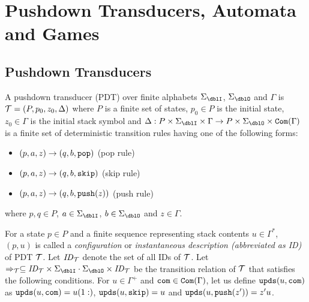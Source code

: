 \section{Pushdown Transducers, Automata and Games}
\subsection{Pushdown Transducers}
\begin{definition}
A {pushdown transducer} (PDT)
over finite alphabets $\Sigma_\dblI$, $\Sigma_\dblO$ and $\Gamma$
is ${\cal T}=(P, p_0, z_0, \Delta)$ where
$P$ is a finite set of states,
$p_0\in P$ is the initial state,
$z_0\in \Gamma$ is the initial stack symbol and
$\Delta: P\times \Sigma_\dblI \times \Gamma \to P\times \Sigma_\dblO \times \Com(\Gamma)$ is a finite set of deterministic transition rules having one of the following forms:
\begin{itemize}
\item $(p, a, z) \rightarrow (q, b, \mathtt{pop})$ \quad (pop rule)
\item $(p, a, z) \rightarrow (q, b, \mathtt{skip})$ \quad (skip rule)
\item $(p, a, z) \rightarrow (q, b, \mathtt{push}(z))$ \quad (push rule)
\end{itemize}
where $p, q\in P$, $a\in\Sigma_\dblI$, $b\in\Sigma_\dblO$ and $z\in\Gamma$.
\end{definition}
\noindent
For a state $p\in P$ and
a finite sequence representing stack contents $u \in \Gamma^*$,
$(p, u)$ is called
a {\em configuration} or {\em instantaneous description (abbreviated as ID)} of PDT ${\cal T}$. Let $\mathit{ID}_{\cal T}$ denote the set of all IDs of ${\cal T}$.
Let $\Rightarrow_\calT\subseteq \ID_\calT\times \Sigma_\dblI\cdot\Sigma_\dblO\times \ID_\calT$ be the transition relation of ${\cal T}$ that satisfies the following conditions.
For $u\in\Gamma^+$ and $\mathtt{com}\in\mathtt{Com}(\Gamma)$, let us define $\mathtt{upds}(u,\mathtt{com})$
as $\mathtt{upds}(u,\mathtt{com})=u(1:)$, $\mathtt{upds}(u,\mathtt{skip})=u$ and $\mathtt{upds}(u,\mathtt{push}(z'))=z'u$.

